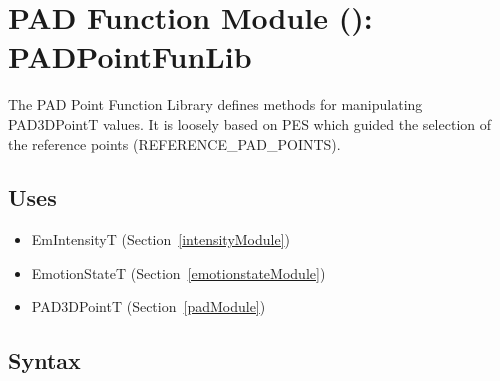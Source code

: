 \section{PAD Function Module ():
PADPointFunLib}\label{padFunModule}
The PAD Point Function Library defines methods for manipulating PAD3DPointT
values. It is loosely based on PES which guided the selection of the reference
points (REFERENCE\_PAD\_POINTS).

\subsection{Uses}
\begin{itemize}[noitemsep, nosep]

    \item EmIntensityT (Section~\ref{intensityModule})

    \item EmotionStateT (Section~\ref{emotionstateModule})

    \item PAD3DPointT (Section~\ref{padModule})

\end{itemize}

\subsection{Syntax}

